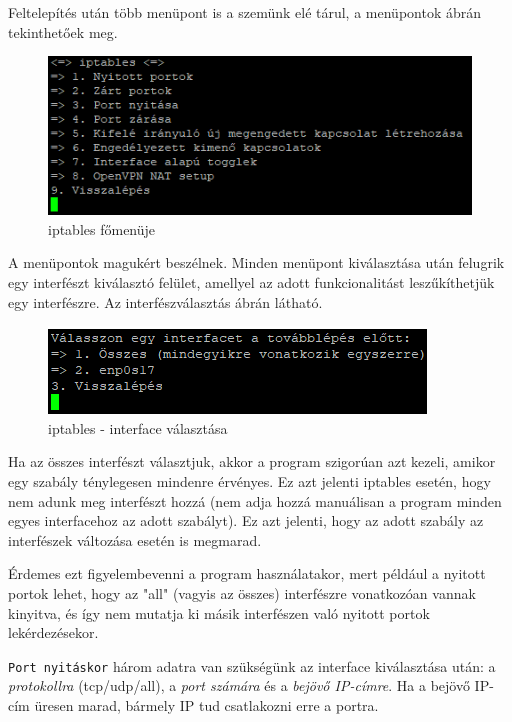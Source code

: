 Feltelepítés után több menüpont is a szemünk elé tárul, a menüpontok  ábrán tekinthetőek meg.

\begin{figure}[h]
\centering
\includegraphics[scale=1]{images/iptables_mainmenu.png}
\caption{iptables főmenüje}
\label{fig:iptables_mainmenu}
\end{figure}

A menüpontok magukért beszélnek. Minden menüpont kiválasztása után felugrik egy interfészt kiválasztó felület, amellyel az adott funkcionalitást leszűkíthetjük egy interfészre. Az interfészválasztás  ábrán látható.

\begin{figure}[h]
\centering
\includegraphics[scale=1]{images/iptables_interface_select.png}
\caption{iptables - interface választása}
\label{fig:iptables_interface_select}
\end{figure}

Ha az összes interfészt választjuk, akkor a program szigorúan azt kezeli, amikor egy szabály ténylegesen mindenre érvényes. Ez azt jelenti iptables esetén, hogy nem adunk meg interfészt hozzá (nem adja hozzá manuálisan a program minden egyes interfacehoz az adott szabályt). Ez azt jelenti, hogy az adott szabály az interfészek változása esetén is megmarad. 

Érdemes ezt figyelembevenni a program használatakor, mert például a nyitott portok lehet, hogy az "all" (vagyis az összes) interfészre vonatkozóan vannak kinyitva, és így nem mutatja ki másik interfészen való nyitott portok lekérdezésekor.

\pagebreak

\texttt{Port nyitáskor} három adatra van szükségünk az interface kiválasztása után: a \textit{protokollra} (tcp/udp/all), a \textit{port számára} és a \textit{bejövő IP-címre}. Ha a bejövő IP-cím üresen marad, bármely IP tud csatlakozni erre a portra.

